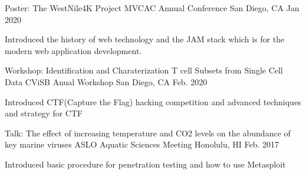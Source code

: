 
\begin{cventries}
  \cventry
    {Poster: The WestNile4K Project} %
    {MVCAC Annual Conference} %
    {San Diego, CA} %
    {Jan 2020} %
    {
      \begin{cvitems} %
        \item {Introduced the history of web technology and the JAM stack which is for the modern web application development.}
      \end{cvitems}
    }

  \cventry
    {Workshop: Identification and Charaterization T cell Subsets from Single Cell Data} %
    {CViSB Anual Workshop} %
    {San Diego, CA} %
    {Feb. 2020} %
    {
      \begin{cvitems} %
        \item {Introduced CTF(Capture the Flag) hacking competition and advanced techniques and strategy for CTF}
      \end{cvitems}
    }

  \cventry
    {Talk: The effect of increasing temperature and CO2 levels on the abundance of key marine viruses} %
    {ASLO Aquatic Sciences Meeting} %
    {Honolulu, HI} %
    {Feb. 2017} %
    {
      \begin{cvitems} %
        \item {Introduced basic procedure for penetration testing and how to use Metasploit}
      \end{cvitems}
    }

\end{cventries}
